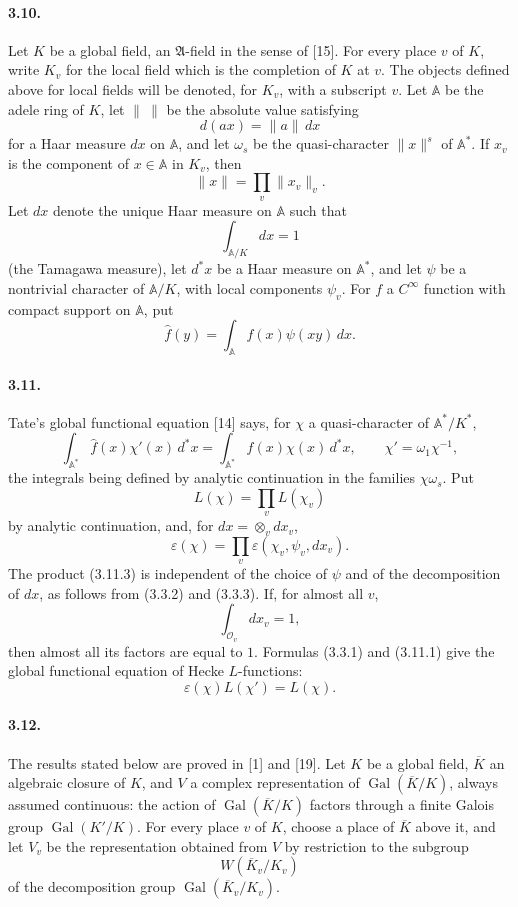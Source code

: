 \documentclass[10pt,letterpaper]{article}
\newcommand{\Gal}{\operatorname{Gal}}
\providecommand{\Gal}{\operatorname{Gal}}
\providecommand{\Gal}{\operatorname{Gal}}
\providecommand{\Gal}{\operatorname{Gal}}
\providecommand{\Gal}{\operatorname{Gal}}
\begin{document}
\paragraph{3.10.} Let \(K\) be a global field, an \(\mathfrak A\)-field in the sense of [15]. For every place \(v\) of \(K\), write \(K_v\) for the local field which is the completion of \(K\) at \(v\). The objects defined above for local fields will be denoted, for \(K_v\), with a subscript \(v\). Let \(\mathbb A\) be the adele ring of \(K\), let \(\|\ \|\) be the absolute value satisfying
\[
d(ax)=\|a\|\,dx
\]
for a Haar measure \(dx\) on \(\mathbb A\), and let \(\omega_s\) be the quasi-character \(\|x\|^s\) of \(\mathbb A^*\). If \(x_v\) is the component of \(x\in\mathbb A\) in \(K_v\), then
\[
\|x\|=\prod_v\|x_v\|_v.
\]
Let \(dx\) denote the unique Haar measure on \(\mathbb A\) such that
\[
\int_{\mathbb A/K}dx=1
\]
(the Tamagawa measure), let \(d^*x\) be a Haar measure on \(\mathbb A^*\), and let \(\psi\) be a nontrivial character of \(\mathbb A/K\), with local components \(\psi_v\). For \(f\) a \(C^\infty\) function with compact support on \(\mathbb A\), put
\[
\widehat f(y)=\int_{\mathbb A}f(x)\psi(xy)\,dx.
\]



\paragraph{3.11.} Tate's global functional equation [14] says, for \(\chi\) a quasi-character of \(\mathbb A^*/K^*\),
\[
\tag{3.11.1}
\int_{\mathbb A^*}\widehat f(x)\chi'(x)\,d^*x
=
\int_{\mathbb A^*}f(x)\chi(x)\,d^*x,
\qquad
\chi'=\omega_1\chi^{-1},
\]
the integrals being defined by analytic continuation in the families \(\chi\omega_s\). Put
\[
\tag{3.11.2}
L(\chi)=\prod_vL(\chi_v)
\]
by analytic continuation, and, for \(dx=\otimes_vdx_v\),
\[
\tag{3.11.3}
\varepsilon(\chi)=\prod_v\varepsilon(\chi_v,\psi_v,dx_v).
\]
The product (3.11.3) is independent of the choice of \(\psi\) and of the decomposition of \(dx\), as follows from (3.3.2) and (3.3.3). If, for almost all \(v\),
\[
\int_{\mathcal O_v}dx_v=1,
\]
then almost all its factors are equal to \(1\). Formulas (3.3.1) and (3.11.1) give the global functional equation of Hecke \(L\)-functions:
\[
\tag{3.11.4}
\varepsilon(\chi)L(\chi')=L(\chi).
\]



\paragraph{3.12.} The results stated below are proved in [1] and [19]. Let \(K\) be a global field, \(\overline K\) an algebraic closure of \(K\), and \(V\) a complex representation of \(\Gal(\overline K/K)\), always assumed continuous: the action of \(\Gal(\overline K/K)\) factors through a finite Galois group \(\Gal(K'/K)\). For every place \(v\) of \(K\), choose a place of \(\overline K\) above it, and let \(V_v\) be the representation obtained from \(V\) by restriction to the subgroup
\[
W(\overline K_v/K_v)
\]
of the decomposition group \(\Gal(\overline K_v/K_v)\).
\end{document}
